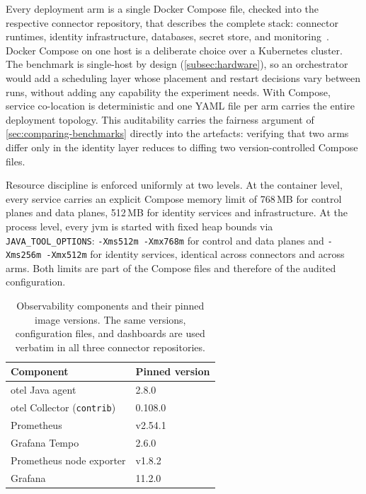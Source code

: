 Every deployment arm is a single Docker Compose file, checked into the respective connector repository, that describes the complete stack: connector runtimes, identity infrastructure, databases, secret store, and monitoring~\citep{dockerComposeDocs}. Docker Compose on one host is a deliberate choice over a Kubernetes cluster. The benchmark is single-host by design (\cref{subsec:hardware}), so an orchestrator would add a scheduling layer whose placement and restart decisions vary between runs, without adding any capability the experiment needs. With Compose, service co-location is deterministic and one YAML file per arm carries the entire deployment topology. This auditability carries the fairness argument of \cref{sec:comparing-benchmarks} directly into the artefacts: verifying that two arms differ only in the identity layer reduces to diffing two version-controlled Compose files.

Resource discipline is enforced uniformly at two levels. At the container level, every service carries an explicit Compose memory limit of 768\,MB for control planes and data planes, 512\,MB for identity services and infrastructure. At the process level, every \gls{jvm} is started with fixed heap bounds via \texttt{JAVA\_TOOL\_OPTIONS}: \texttt{-Xms512m -Xmx768m} for control and data planes and \texttt{-Xms256m -Xmx512m} for identity services, identical across connectors and across arms. Both limits are part of the Compose files and therefore of the audited configuration.

\begin{table}[ht]
    \centering
    \small
    \begin{tabularx}{0.86\textwidth}{@{}X l@{}}
        \toprule
        \textbf{Component} & \textbf{Pinned version} \\
        \midrule
        \gls{otel} Java agent & 2.8.0 \\
        \gls{otel} Collector (\texttt{contrib}) & 0.108.0 \\
        Prometheus & v2.54.1 \\
        Grafana Tempo & 2.6.0 \\
        Prometheus node exporter & v1.8.2 \\
        Grafana & 11.2.0 \\
        \bottomrule
    \end{tabularx}
    \caption[Pinned observability image versions]{Observability components and their pinned image versions. The same versions, configuration files, and dashboards are used verbatim in all three connector repositories.}
    \label{tab:image-pins}
\end{table}

